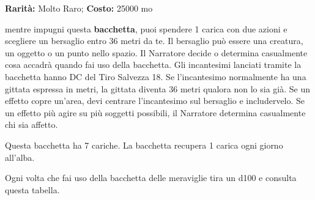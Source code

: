 \begin{multicols}{2}

\textbf{Rarità:} Molto Raro; \textbf{Costo:} 25000 mo

mentre impugni questa \textbf{bacchetta}, puoi spendere 1 carica con due azioni e scegliere un bersaglio entro 36 metri da te. Il bersaglio può essere una creatura, un oggetto o un punto nello spazio. Il Narratore decide o determina casualmente cosa accadrà quando fai uso della bacchetta. Gli incantesimi lanciati tramite la bacchetta hanno DC del Tiro Salvezza 18. Se l'incantesimo normalmente ha una gittata espressa in metri, la gittata diventa 36 metri qualora non lo sia già. Se un effetto copre un'area, devi centrare l'incantesimo sul bersaglio e includervelo. Se un effetto più agire su più soggetti possibili, il Narratore determina casualmente chi sia affetto.

Questa bacchetta ha 7 cariche. La bacchetta recupera 1 carica ogni giorno all'alba.

Ogni volta che fai uso della bacchetta delle meraviglie tira un d100 e consulta questa tabella.


%

\medskip


\end{multicols}
